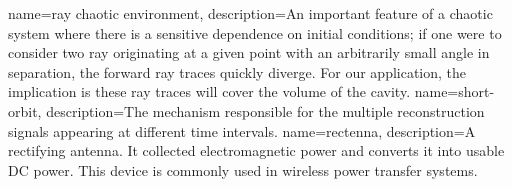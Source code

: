 {
   name=ray chaotic environment,
  description={An important feature of a chaotic system where there is a sensitive dependence on initial conditions; if one were to consider two ray originating at a given point with an arbitrarily small angle in separation, the forward ray traces quickly diverge. For our application, the implication is these ray traces will cover the volume of the cavity.}
}
{
   name=short-orbit,
  description={The mechanism responsible for the multiple reconstruction signals appearing at different time intervals. }
}
{
   name=rectenna,
  description={A rectifying antenna. It collected electromagnetic power and converts it into usable DC power. This device is commonly used in wireless power transfer systems. }
}

